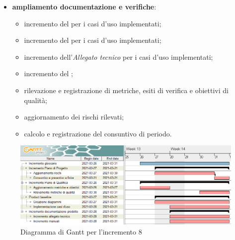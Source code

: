 \begin{itemize}
\item \textbf{ampliamento documentazione e verifiche}:
\begin{itemize}
\item incremento del \MU{} per i casi d'uso implementati;
\item incremento del \MM{} per i casi d'uso implementati;
\item incremento dell'\textit{Allegato tecnico} per i casi d'uso implementati;
\item incremento del ;
\item rilevazione e registrazione di metriche, esiti di verifica e obiettivi di qualità;
\item aggiornamento dei rischi rilevati;
\item calcolo e registrazione del consuntivo di periodo.
\end{itemize}

\end{itemize}
\begin{figure}[H]
\centering

\centerline{\includegraphics[scale=0.6]{res/Pianificazione/Fasi/CodificaIncrementi/ganttIncremento8}}
\caption{Diagramma di Gantt per l'incremento 8}
\end{figure}